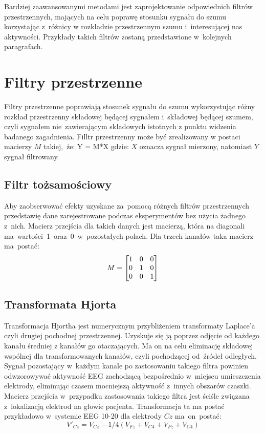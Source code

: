 \documentclass[licencjacka,openright]{pracamgr}
\begin{document}
Bardziej zaawansowanymi metodami jest zaprojektowanie odpowiednich filtrów przestrzennych, mających na celu poprawę stosunku sygnału do szumu korzystając z~różnicy w rozkładzie przestrzennym szumu i~interesującej nas aktywności. Przykłady takich filtrów zostaną przedstawione w~kolejnych paragrafach.

\section{Filtry przestrzenne}
Filtry przestrzenne poprawiają stosunek sygnału do szumu wykorzystując różny rozkład przestrzenny składowej będącej sygnałem i~składowej będącej szumem, czyli sygnałem nie~zawierającym składowych istotnych z punktu widzenia badanego zagadnienia.
Filltr przestrzenny może być zrealizowany w postaci macierzy $M$ takiej,~że: 
Y = M*X
gdzie: $X$ oznacza sygnał mierzony, natomiast $Y$ sygnał filtrowany.

\subsection{Filtr tożsamościowy}
Aby zaobserwować efekty uzyskane za~pomocą różnych filtrów przestrzennych przedstawię dane zarejestrowane podczas eksperymentów bez użycia żadnego z~nich. Macierz przejścia dla takich danych jest macierzą, która na diagonali ma~wartości~1~oraz~0~w~pozostałych polach.
Dla trzech kanałów taka macierz ma~postać:
\[
M =
\begin{bmatrix}
  $1$ & $0$ & $0$ \\
  $0$ & $1$ & $0$ \\
  $0$ & $0$ & $1$ 
\end{bmatrix}
\]

\subsection{Transformata Hjorta}
Transformacja Hjortha \citep{hjorth1975} jest numerycznym przybliżeniem transformaty Laplace'a czyli drugiej pochodnej przestrzennej. Uzyskuje się ją poprzez odjęcie od każdego kanału średniej z kanałów go otaczających. Ma on na celu eliminację składowej wspólnej dla transformowanych kanałów, czyli pochodzącej od~źródeł odległych. Sygnał pozostający w~każdym kanale po zastosowaniu takiego filtra powinien odwzorowywać aktywność EEG zachodzącą bezpośrednio w~miejscu umieszczenia elektrody, eliminując czasem mocniejszą aktywność z~innych obszarów czaszki.
Macierz przejścia w~przypadku zastosowania takiego filtra jest ściśle związana z~lokalizacją elektrod na głowie pacjenta.
Transformacja ta ma postać przykładowo w~systemie EEG 10-20 dla elektrody $Cz$ ma~on~postać:
\begin{equation}
V'_{Cz} = V_{Cz} - 1/4(V_{Fz}+V_{C4}+V_{Pz}+V_{C4})
\end{equation}
\end{document}
